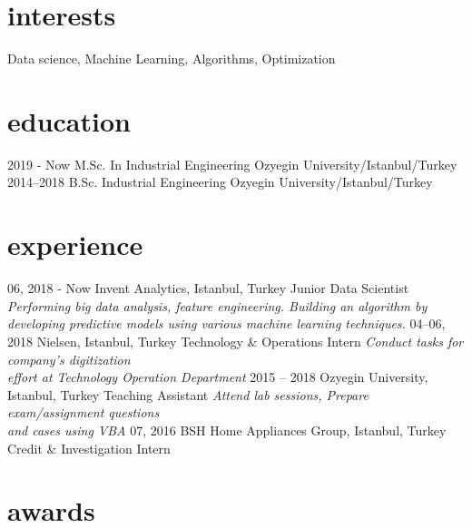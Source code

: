 \documentclass[]{zbatuhan-cv}
\begin{document}
\section{interests}

Data science, Machine Learning, Algorithms, Optimization

\section{education}

\begin{entrylist}
  \entry
    {2019 - Now}
    {M.Sc. {\normalfont In Industrial Engineering}}
    {Ozyegin University/Istanbul/Turkey}
    {}
  \entry
    {2014–2018}
    {B.Sc. {\normalfont Industrial Engineering}}
    {Ozyegin University/Istanbul/Turkey}
    {}
\end{entrylist}

\vspace{-0.35cm}

\section{experience}

\begin{entrylist}
  \entry
    {06, 2018 - Now}
    {Invent Analytics, Istanbul, Turkey}
    {Junior Data Scientist}
    {\emph{\small Performing big data analysis, feature engineering. Building an algorithm by  developing predictive models using various machine learning techniques.}}
  \entry
    {04–06, 2018}
    {Nielsen, Istanbul, Turkey}
    {Technology \& Operations Intern}
    {\emph{\small Conduct tasks for company's digitization \\ effort at Technology Operation Department}}
    \entry
    {2015 – 2018}
    {Ozyegin University, Istanbul, Turkey}
    {Teaching Assistant}
    {\emph{\small Attend lab sessions, Prepare exam/assignment questions \\ and cases using VBA}}
  \entry
    {07, 2016}
    {BSH Home Appliances Group, Istanbul, Turkey}
    {Credit \& Investigation Intern}
    {}
  
\end{entrylist}


\vspace{-0.35cm}

\section{awards}
\end{document}
